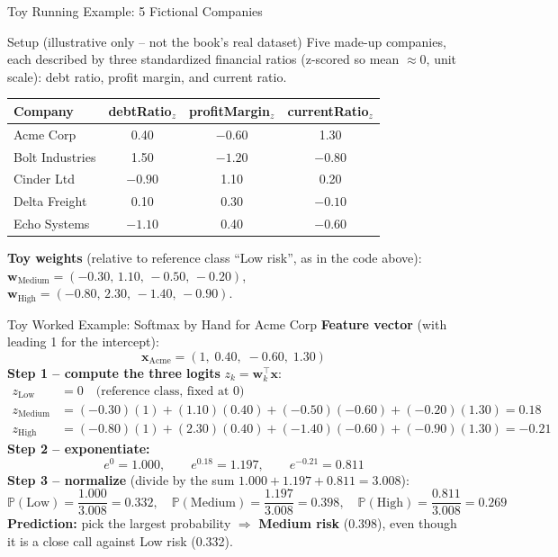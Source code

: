 \documentclass[aspectratio=169,10pt]{beamer}
\newcommand{\Prob}{\mathbb{P}}
\newcommand{\x}{\mathbf{x}}
\begin{document}
\begin{frame}{Toy Running Example: 5 Fictional Companies}
  \begin{block}{Setup (illustrative only -- not the book's real dataset)}
    Five made-up companies, each described by three standardized financial
    ratios (z-scored so mean $\approx 0$, unit scale): debt ratio, profit
    margin, and current ratio.
  \end{block}
  \begin{center}
  \renewcommand{\arraystretch}{1.15}
  \begin{tabular}{lccc}
    \toprule
    \textbf{Company} & \textbf{debtRatio}$_z$ & \textbf{profitMargin}$_z$ & \textbf{currentRatio}$_z$\\
    \midrule
    Acme Corp        &  0.40 & $-0.60$ &  1.30 \\
    Bolt Industries  &  1.50 & $-1.20$ & $-0.80$ \\
    Cinder Ltd       & $-0.90$ &  1.10 &  0.20 \\
    Delta Freight    &  0.10 &  0.30 & $-0.10$ \\
    Echo Systems     & $-1.10$ &  0.40 & $-0.60$ \\
    \bottomrule
  \end{tabular}
  \end{center}
  \vspace{0.4em}
  \textbf{Toy weights} (relative to reference class ``Low risk'', as in the
  code above): $\mathbf{w}_{\text{Medium}} = (-0.30,\,1.10,\,-0.50,\,-0.20)$,
  $\mathbf{w}_{\text{High}} = (-0.80,\,2.30,\,-1.40,\,-0.90)$.
\end{frame}

\begin{frame}{Toy Worked Example: Softmax by Hand for Acme Corp}
  \textbf{Feature vector} (with leading 1 for the intercept):
  \[
    \x_{\text{Acme}} = (1,\; 0.40,\; -0.60,\; 1.30)
  \]
  \textbf{Step 1 -- compute the three logits} $z_k = \mathbf{w}_k^\top \x$:
  \begin{align*}
    z_{\text{Low}}    &= 0 \quad\text{(reference class, fixed at 0)}\\
    z_{\text{Medium}} &= (-0.30)(1) + (1.10)(0.40) + (-0.50)(-0.60) + (-0.20)(1.30) = 0.18\\
    z_{\text{High}}   &= (-0.80)(1) + (2.30)(0.40) + (-1.40)(-0.60) + (-0.90)(1.30) = -0.21
  \end{align*}
  \textbf{Step 2 -- exponentiate:}
  \[
    e^{0} = 1.000, \qquad e^{0.18} = 1.197, \qquad e^{-0.21} = 0.811
  \]
  \textbf{Step 3 -- normalize} (divide by the sum $1.000+1.197+0.811 = 3.008$):
  \[
    \Prob(\text{Low}) = \frac{1.000}{3.008} = 0.332,\quad
    \Prob(\text{Medium}) = \frac{1.197}{3.008} = 0.398,\quad
    \Prob(\text{High}) = \frac{0.811}{3.008} = 0.269
  \]
  \textbf{Prediction:} pick the largest probability $\Rightarrow$
  \textbf{Medium risk} (0.398), even though it is a close call against Low
  risk (0.332).
\end{frame}
\end{document}
